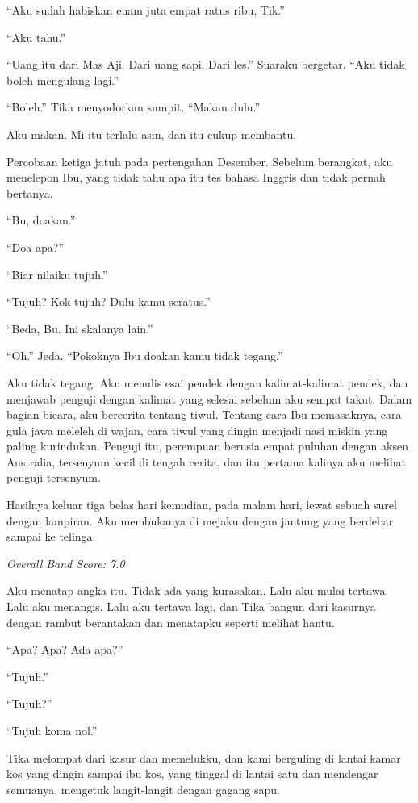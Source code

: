 \documentclass[11pt,twoside,openany]{book}
\begin{document}
``Aku sudah habiskan enam juta empat ratus ribu, Tik.''

``Aku tahu.''

``Uang itu dari Mas Aji. Dari uang sapi. Dari les.'' Suaraku bergetar. ``Aku tidak boleh mengulang lagi.''

``Boleh.'' Tika menyodorkan sumpit. ``Makan dulu.''

Aku makan. Mi itu terlalu asin, dan itu cukup membantu.

Percobaan ketiga jatuh pada pertengahan Desember. Sebelum berangkat, aku menelepon Ibu, yang tidak tahu apa itu tes bahasa Inggris dan tidak pernah bertanya.

``Bu, doakan.''

``Doa apa?''

``Biar nilaiku tujuh.''

``Tujuh? Kok tujuh? Dulu kamu seratus.''

``Beda, Bu. Ini skalanya lain.''

``Oh.'' Jeda. ``Pokoknya Ibu doakan kamu tidak tegang.''

Aku tidak tegang. Aku menulis esai pendek dengan kalimat-kalimat pendek, dan menjawab penguji dengan kalimat yang selesai sebelum aku sempat takut. Dalam bagian bicara, aku bercerita tentang tiwul. Tentang cara Ibu memasaknya, cara gula jawa meleleh di wajan, cara tiwul yang dingin menjadi nasi miskin yang paling kurindukan. Penguji itu, perempuan berusia empat puluhan dengan aksen Australia, tersenyum kecil di tengah cerita, dan itu pertama kalinya aku melihat penguji tersenyum.

Hasilnya keluar tiga belas hari kemudian, pada malam hari, lewat sebuah surel dengan lampiran. Aku membukanya di mejaku dengan jantung yang berdebar sampai ke telinga.

\emph{Overall Band Score: 7.0}

Aku menatap angka itu. Tidak ada yang kurasakan. Lalu aku mulai tertawa. Lalu aku menangis. Lalu aku tertawa lagi, dan Tika bangun dari kasurnya dengan rambut berantakan dan menatapku seperti melihat hantu.

``Apa? Apa? Ada apa?''

``Tujuh.''

``Tujuh?''

``Tujuh koma nol.''

Tika melompat dari kasur dan memelukku, dan kami berguling di lantai kamar kos yang dingin sampai ibu kos, yang tinggal di lantai satu dan mendengar semuanya, mengetuk langit-langit dengan gagang sapu.
\end{document}
